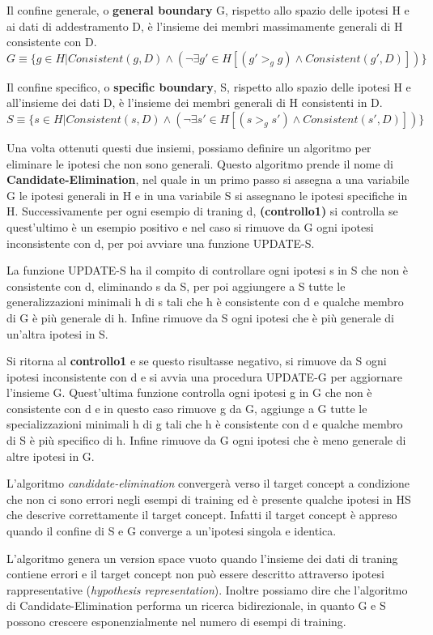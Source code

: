 \documentclass[a4paper]{extarticle}
\begin{document}
Il confine generale, o \textbf{general boundary} G, rispetto allo spazio delle ipotesi H e ai dati di addestramento D, è l'insieme dei membri massimamente generali di H consistente con D. $G \equiv \{ g \in H | Consistent(g,D) \land ( \neg \exists g' \in H [(g' >_g g) \land Consistent(g',D)])\}$

Il confine specifico, o \textbf{specific boundary}, S, rispetto allo spazio delle ipotesi H e all'insieme dei dati D, è l'insieme dei membri generali di H consistenti in D. $S \equiv \{ s \in H | Consistent(s,D) \land ( \neg \exists s' \in H [(s >_g s') \land Consistent(s',D)])\}$

Una volta ottenuti questi due insiemi, possiamo definire un algoritmo per eliminare le ipotesi che non sono generali. Questo algoritmo prende il nome di \textbf{Candidate-Elimination}, nel quale in un primo passo si assegna a una variabile G le ipotesi generali in H e in una variabile S si assegnano le ipotesi specifiche in H. Successivamente per ogni esempio di traning d, \textbf{(controllo1)} si controlla se quest'ultimo è un esempio positivo e nel caso si rimuove da G ogni ipotesi inconsistente con d, per poi avviare una funzione UPDATE-S.

La funzione UPDATE-S ha il compito di controllare ogni ipotesi s in S che non è consistente con d, eliminando s da S, per poi aggiungere a S tutte le generalizzazioni minimali h di s tali che h è consistente con d e qualche membro di G è più generale di h. Infine rimuove da S ogni ipotesi che è più generale di un'altra ipotesi in S.

Si ritorna al \textbf{controllo1} e se questo risultasse negativo, si rimuove da S ogni ipotesi inconsistente con d e si avvia una procedura UPDATE-G per aggiornare l'insieme G. Quest'ultima funzione controlla ogni ipotesi g in G che non è consistente con d e in questo caso rimuove g da G, aggiunge a G tutte le specializzazioni minimali h di g tali che h è consistente con d e qualche membro di S è più specifico di h. Infine rimuove da G ogni ipotesi che è meno generale di altre ipotesi in G.

L'algoritmo \textit{candidate-elimination} convergerà verso il target concept a condizione che non ci sono errori negli esempi di training ed è presente qualche ipotesi in HS che descrive correttamente il target concept. Infatti il target concept è appreso quando il confine di S e G converge a un'ipotesi singola e identica.

L'algoritmo genera un version space vuoto quando l'insieme dei dati di traning contiene errori e il target concept non può essere descritto attraverso ipotesi rappresentative (\textit{hypothesis representation}). Inoltre possiamo dire che l'algoritmo di Candidate-Elimination performa un ricerca bidirezionale, in quanto G e S possono crescere esponenzialmente nel numero di esempi di training.
\end{document}
